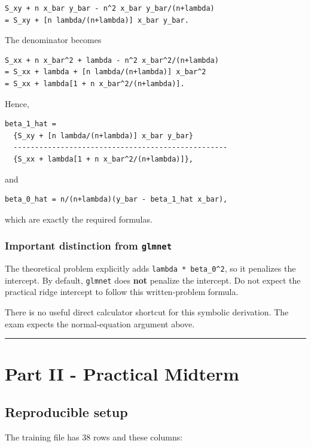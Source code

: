﻿\documentclass[11pt]{article}
\begin{document}
\begin{lstlisting}
S_xy + n x_bar y_bar - n^2 x_bar y_bar/(n+lambda)
= S_xy + [n lambda/(n+lambda)] x_bar y_bar.
\end{lstlisting}

The denominator becomes

\begin{lstlisting}
S_xx + n x_bar^2 + lambda - n^2 x_bar^2/(n+lambda)
= S_xx + lambda + [n lambda/(n+lambda)] x_bar^2
= S_xx + lambda[1 + n x_bar^2/(n+lambda)].
\end{lstlisting}

Hence,

\begin{lstlisting}
beta_1_hat =
  {S_xy + [n lambda/(n+lambda)] x_bar y_bar}
  --------------------------------------------------
  {S_xx + lambda[1 + n x_bar^2/(n+lambda)]},
\end{lstlisting}

and

\begin{lstlisting}
beta_0_hat = n/(n+lambda)(y_bar - beta_1_hat x_bar),
\end{lstlisting}

which are exactly the required formulas.

\subsubsection{Important distinction from \texttt{glmnet}}

The theoretical problem explicitly adds \texttt{lambda * beta\_0\textasciicircum{}2}, so it penalizes the
intercept. By default, \texttt{glmnet} does \textbf{not} penalize the intercept. Do not expect
the practical ridge intercept to follow this written-problem formula.

There is no useful direct calculator shortcut for this symbolic derivation. The
exam expects the normal-equation argument above.

\medskip\hrule\medskip

\section{Part II - Practical Midterm}

\subsection{Reproducible setup}

The training file has 38 rows and these columns:
\end{document}
